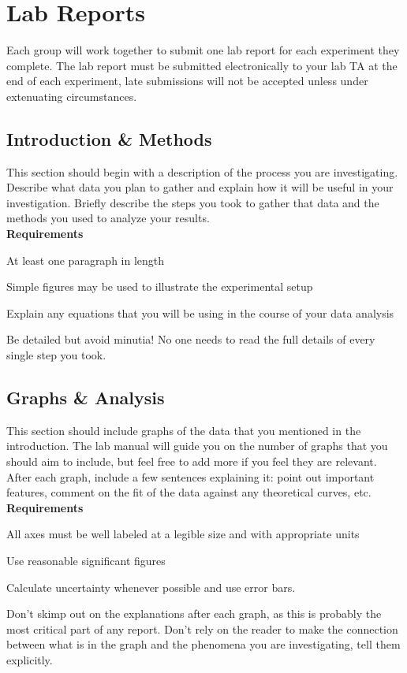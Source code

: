 \newpage

\section*{Lab Reports}
Each group will work together to submit one lab report for each experiment they complete.
The lab report must be submitted electronically to your lab TA at the end of each experiment, late submissions will not be accepted unless under extenuating circumstances.

\subsection*{Introduction \& Methods}
This section should begin with a description of the process you are investigating.
Describe what data you plan to gather and explain how it will be useful in your investigation.
Briefly describe the steps you took to gather that data and the methods you used to analyze your results. \\
\textbf{Requirements}
\begin{list}{-}{\topsep=0pt \itemsep=0pt}
	\item At least one paragraph in length
	\item Simple figures may be used to illustrate the experimental setup
	\item Explain any equations that you will be using in the course of your data analysis
	\item Be detailed but avoid minutia! No one needs to read the full details of every single step you took. 
\end{list}

\subsection*{Graphs \& Analysis}
This section should include graphs of the data that you mentioned in the introduction.
The lab manual will guide you on the number of graphs that you should aim to include, but feel free to add more if you feel they are relevant.
After each graph, include a few sentences explaining it: point out important features, comment on the fit of the data against any theoretical curves, etc. \\
\textbf{Requirements}
\begin{list}{-}{\topsep=0pt \itemsep=0pt}
	\item All axes must be well labeled at a legible size and with appropriate units
	\item Use reasonable significant figures
	\item Calculate uncertainty whenever possible and use error bars.
	\item Don't skimp out on the explanations after each graph, as this is probably the most critical part of any report. Don't rely on the reader to make the connection between what is in the graph and the phenomena you are investigating, tell them explicitly.
\end{list}

